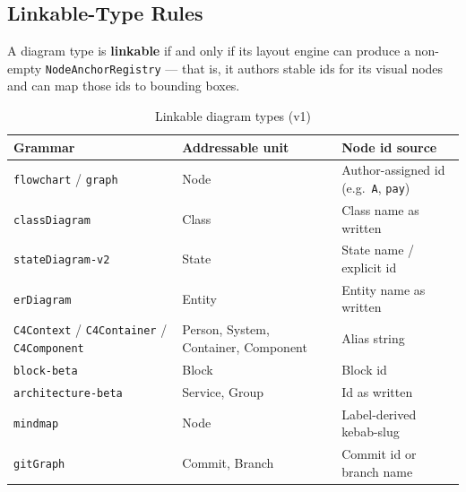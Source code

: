\subsection{Linkable-Type Rules}
\label{sec:cdl-linkable-types}

A diagram type is \textbf{linkable} if and only if its layout engine can
produce a non-empty \texttt{NodeAnchorRegistry} --- that is, it authors stable
ids for its visual nodes and can map those ids to bounding boxes.

\begin{table}[h]
\centering\small
\caption{Linkable diagram types (v1)}
\begin{tabularx}{\textwidth}{llX}
\toprule
\textbf{Grammar} & \textbf{Addressable unit} & \textbf{Node id source} \\
\midrule
\texttt{flowchart} / \texttt{graph} & Node & Author-assigned id (e.g.\ \texttt{A}, \texttt{pay}) \\
\texttt{classDiagram} & Class & Class name as written \\
\texttt{stateDiagram-v2} & State & State name / explicit id \\
\texttt{erDiagram} & Entity & Entity name as written \\
\texttt{C4Context} / \texttt{C4Container} / \texttt{C4Component} & Person, System, Container, Component & Alias string \\
\texttt{block-beta} & Block & Block id \\
\texttt{architecture-beta} & Service, Group & Id as written \\
\texttt{mindmap} & Node & Label-derived kebab-slug \\
\texttt{gitGraph} & Commit, Branch & Commit id or branch name \\
\bottomrule
\end{tabularx}
\label{tab:cdl-linkable}
\end{table}

